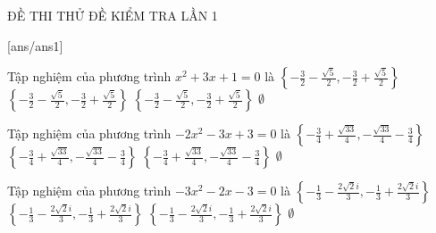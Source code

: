 \begin{name}
{ĐỀ THI THỬ}
{ĐỀ KIỂM TRA LẦN 1}
\end{name}
[ans/ans1]
\begin{ex}
Tập nghiệm của phương trình $x^{2} + 3 x + 1=0$ là
\choice
{$\left\{- \frac{3}{2} - \frac{\sqrt{5}}{2}, - \frac{3}{2} + \frac{\sqrt{5}}{2}\right\}$}
{$\left\{- \frac{3}{2} - \frac{\sqrt{5}}{2}, - \frac{3}{2} + \frac{\sqrt{5}}{2}\right\}$}
{$\left\{- \frac{3}{2} - \frac{\sqrt{5}}{2}, - \frac{3}{2} + \frac{\sqrt{5}}{2}\right\}$}
{$\emptyset$}
\end{ex}
\begin{ex}
Tập nghiệm của phương trình $- 2 x^{2} - 3 x + 3=0$ là
\choice
{$\left\{- \frac{3}{4} + \frac{\sqrt{33}}{4}, - \frac{\sqrt{33}}{4} - \frac{3}{4}\right\}$}
{$\left\{- \frac{3}{4} + \frac{\sqrt{33}}{4}, - \frac{\sqrt{33}}{4} - \frac{3}{4}\right\}$}
{$\left\{- \frac{3}{4} + \frac{\sqrt{33}}{4}, - \frac{\sqrt{33}}{4} - \frac{3}{4}\right\}$}
{$\emptyset$}
\end{ex}
\begin{ex}
Tập nghiệm của phương trình $- 3 x^{2} - 2 x - 3=0$ là
\choice
{$\left\{- \frac{1}{3} - \frac{2 \sqrt{2} i}{3}, - \frac{1}{3} + \frac{2 \sqrt{2} i}{3}\right\}$}
{$\left\{- \frac{1}{3} - \frac{2 \sqrt{2} i}{3}, - \frac{1}{3} + \frac{2 \sqrt{2} i}{3}\right\}$}
{$\left\{- \frac{1}{3} - \frac{2 \sqrt{2} i}{3}, - \frac{1}{3} + \frac{2 \sqrt{2} i}{3}\right\}$}
{$\emptyset$}
\end{ex}
